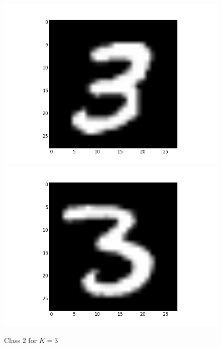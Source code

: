 \documentclass[submit]{harvardml}
\begin{document}
\begin{figure}[ht]
    \includegraphics[scale=0.15]{K3-representative-1-2}
    \includegraphics[scale=0.15]{K3-representative-1-3}
    \caption{Class 2 for $K=3$}
\end{figure}
\end{document}
